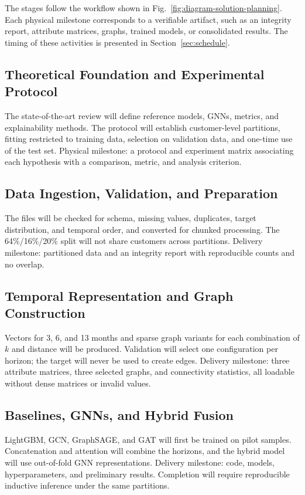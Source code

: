 \documentclass[conference]{IEEEtran}
\begin{document}
The stages follow the workflow shown in Fig.~\ref{fig:diagram-solution-planning}. Each physical milestone corresponds to a verifiable artifact, such as an integrity report, attribute matrices, graphs, trained models, or consolidated results. The timing of these activities is presented in Section~\ref{sec:schedule}.

\subsection{Theoretical Foundation and Experimental Protocol}

The state-of-the-art review will define reference models, GNNs, metrics, and explainability methods. The protocol will establish customer-level partitions, fitting restricted to training data, selection on validation data, and one-time use of the test set. Physical milestone: a protocol and experiment matrix associating each hypothesis with a comparison, metric, and analysis criterion.

\subsection{Data Ingestion, Validation, and Preparation}

The files will be checked for schema, missing values, duplicates, target distribution, and temporal order, and converted for chunked processing. The 64\%/16\%/20\% split will not share customers across partitions. Delivery milestone: partitioned data and an integrity report with reproducible counts and no overlap.

\subsection{Temporal Representation and Graph Construction}

Vectors for 3, 6, and 13 months and sparse graph variants for each combination of $k$ and distance will be produced. Validation will select one configuration per horizon; the target will never be used to create edges. Delivery milestone: three attribute matrices, three selected graphs, and connectivity statistics, all loadable without dense matrices or invalid values.

\subsection{Baselines, GNNs, and Hybrid Fusion}

LightGBM, GCN, GraphSAGE, and GAT will first be trained on pilot samples. Concatenation and attention will combine the horizons, and the hybrid model will use out-of-fold GNN representations. Delivery milestone: code, models, hyperparameters, and preliminary results. Completion will require reproducible inductive inference under the same partitions.
\end{document}
